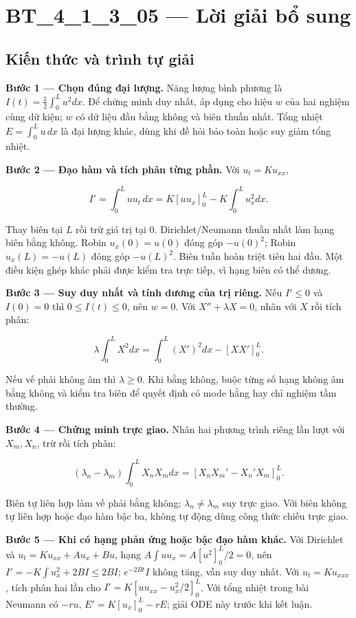 \documentclass[10pt,a4paper]{article}
\begin{document}
\section*{BT\_4\_1\_3\_05 — Lời giải bổ sung}
\subsection*{Kiến thức và trình tự giải}
\textbf{Bước 1 — Chọn đúng đại lượng.} Năng lượng bình phương là $I(t)=\frac12\int_0^Lu^2dx$. Để chứng minh duy nhất, áp dụng cho hiệu $w$ của hai nghiệm cùng dữ kiện; $w$ có dữ liệu đầu bằng không và biên thuần nhất. Tổng nhiệt $E=\int_0^Lu\,dx$ là đại lượng khác, dùng khi đề hỏi bảo toàn hoặc suy giảm tổng nhiệt.

\textbf{Bước 2 — Đạo hàm và tích phân từng phần.} Với $u_t=Ku_{xx}$,


\[
I'=\int_0^Luu_t\,dx
=K[uu_x]_0^L-K\int_0^Lu_x^2dx.
\]


Thay biên tại $L$ rồi trừ giá trị tại $0$. Dirichlet/Neumann thuần nhất làm hạng biên bằng không. Robin $u_x(0)=u(0)$ đóng góp $-u(0)^2$; Robin $u_x(L)=-u(L)$ đóng góp $-u(L)^2$. Biên tuần hoàn triệt tiêu hai đầu. Một điều kiện ghép khác phải được kiểm tra trực tiếp, vì hạng biên có thể dương.

\textbf{Bước 3 — Suy duy nhất và tính dương của trị riêng.} Nếu $I'\le0$ và $I(0)=0$ thì $0\le I(t)\le0$, nên $w=0$. Với $X''+\lambda X=0$, nhân với $X$ rồi tích phân:


\[
\lambda\int_0^LX^2dx=\int_0^L(X')^2dx-[XX']_0^L.
\]


Nếu vế phải không âm thì $\lambda\ge0$. Khi bằng không, buộc từng số hạng không âm bằng không và kiểm tra biên để quyết định có mode hằng hay chỉ nghiệm tầm thường.

\textbf{Bước 4 — Chứng minh trực giao.} Nhân hai phương trình riêng lần lượt với $X_m,X_n$, trừ rồi tích phân:


\[
(\lambda_n-\lambda_m)\int_0^LX_nX_mdx
=[X_nX_m'-X_n'X_m]_0^L.
\]


Biên tự liên hợp làm vế phải bằng không; $\lambda_n\ne\lambda_m$ suy trực giao. Với biên không tự liên hợp hoặc đạo hàm bậc ba, không tự động dùng công thức chiếu trực giao.

\textbf{Bước 5 — Khi có hạng phản ứng hoặc bậc đạo hàm khác.} Với Dirichlet và $u_t=Ku_{xx}+Au_x+Bu$, hạng $A\int uu_x=A[u^2]_0^L/2=0$, nên $I'=-K\int u_x^2+2BI\le2BI$; $e^{-2Bt}I$ không tăng, vẫn suy duy nhất. Với $u_t=Ku_{xxx}$, tích phân hai lần cho $I'=K[uu_{xx}-u_x^2/2]_0^L$. Với tổng nhiệt trong bài Neumann có $-ru$, $E'=K[u_x]_0^L-rE$; giải ODE này trước khi kết luận.
\end{document}
